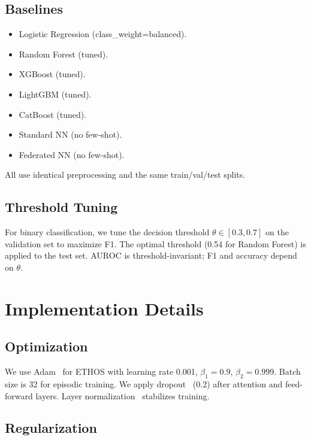 \subsection{Baselines}

\begin{itemize}
\item Logistic Regression (class\_weight=balanced).
\item Random Forest (tuned).
\item XGBoost (tuned).
\item LightGBM (tuned).
\item CatBoost (tuned).
\item Standard NN (no few-shot).
\item Federated NN (no few-shot).
\end{itemize}
All use identical preprocessing and the same train/val/test splits.

\subsection{Threshold Tuning}

For binary classification, we tune the decision threshold $\theta \in [0.3, 0.7]$ on the validation set to maximize F1. The optimal threshold (0.54 for Random Forest) is applied to the test set. AUROC is threshold-invariant; F1 and accuracy depend on $\theta$.

\section{Implementation Details}

\subsection{Optimization}

We use Adam~\cite{kingma2014adam} for ETHOS with learning rate 0.001, $\beta_1=0.9$, $\beta_2=0.999$. Batch size is 32 for episodic training. We apply dropout~\cite{srivastava2014dropout} (0.2) after attention and feed-forward layers. Layer normalization~\cite{ba2016layer} stabilizes training.

\subsection{Regularization}

